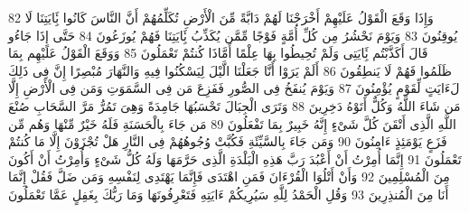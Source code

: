 \documentclass[20pt,a4paper]{article}
\begin{document}
{\tiny\colorbox{cl_aya}{82}} وَإِذَا وَقَعَ الْقَوْلُ عَلَيْهِمْ أَخْرَجْنَا لَهُمْ دَابَّةً مِّنَ الْأَرْضِ تُكَلِّمُهُمْ أَنَّ النَّاسَ كَانُوا بَِٔايَتِنَا لَا يُوقِنُونَ
{\tiny\colorbox{cl_aya}{83}} وَيَوْمَ نَحْشُرُ مِن كُلِّ أُمَّةٍ فَوْجًا مِّمَّن يُكَذِّبُ بَِٔايَتِنَا فَهُمْ يُوزَعُونَ
{\tiny\colorbox{cl_aya}{84}} حَتَّى إِذَا جَاءُو قَالَ أَكَذَّبْتُم بَِٔايَتِى وَلَمْ تُحِيطُوا بِهَا عِلْمًا أَمَّاذَا كُنتُمْ تَعْمَلُونَ
{\tiny\colorbox{cl_aya}{85}} وَوَقَعَ الْقَوْلُ عَلَيْهِم بِمَا ظَلَمُوا فَهُمْ لَا يَنطِقُونَ
{\tiny\colorbox{cl_aya}{86}} أَلَمْ يَرَوْا أَنَّا جَعَلْنَا الَّيْلَ لِيَسْكُنُوا فِيهِ وَالنَّهَارَ مُبْصِرًا إِنَّ فِى ذَلِكَ لَءَايَتٍ لِّقَوْمٍ يُؤْمِنُونَ
{\tiny\colorbox{cl_aya}{87}} وَيَوْمَ يُنفَخُ فِى الصُّورِ فَفَزِعَ مَن فِى السَّمَوَتِ وَمَن فِى الْأَرْضِ إِلَّا مَن شَاءَ اللَّهُ وَكُلٌّ أَتَوْهُ دَخِرِينَ
{\tiny\colorbox{cl_aya}{88}} وَتَرَى الْجِبَالَ تَحْسَبُهَا جَامِدَةً وَهِىَ تَمُرُّ مَرَّ السَّحَابِ صُنْعَ اللَّهِ الَّذِى أَتْقَنَ كُلَّ شَىْءٍ إِنَّهُ خَبِيرٌ بِمَا تَفْعَلُونَ
{\tiny\colorbox{cl_aya}{89}} مَن جَاءَ بِالْحَسَنَةِ فَلَهُ خَيْرٌ مِّنْهَا وَهُم مِّن فَزَعٍ يَوْمَئِذٍ ءَامِنُونَ
{\tiny\colorbox{cl_aya}{90}} وَمَن جَاءَ بِالسَّيِّئَةِ فَكُبَّتْ وُجُوهُهُمْ فِى النَّارِ هَلْ تُجْزَوْنَ إِلَّا مَا كُنتُمْ تَعْمَلُونَ
{\tiny\colorbox{cl_aya}{91}} إِنَّمَا أُمِرْتُ أَنْ أَعْبُدَ رَبَّ هَذِهِ الْبَلْدَةِ الَّذِى حَرَّمَهَا وَلَهُ كُلُّ شَىْءٍ وَأُمِرْتُ أَنْ أَكُونَ مِنَ الْمُسْلِمِينَ
{\tiny\colorbox{cl_aya}{92}} وَأَنْ أَتْلُوَا الْقُرْءَانَ فَمَنِ اهْتَدَى فَإِنَّمَا يَهْتَدِى لِنَفْسِهِ وَمَن ضَلَّ فَقُلْ إِنَّمَا أَنَا مِنَ الْمُنذِرِينَ
{\tiny\colorbox{cl_aya}{93}} وَقُلِ الْحَمْدُ لِلَّهِ سَيُرِيكُمْ ءَايَتِهِ فَتَعْرِفُونَهَا وَمَا رَبُّكَ بِغَفِلٍ عَمَّا تَعْمَلُونَ
\end{document}
